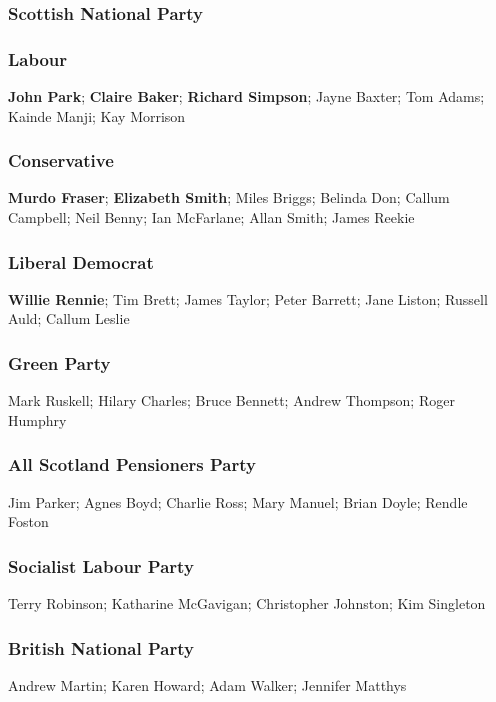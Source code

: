 \begin{resultsiii}
\subsubsection*{Scottish National Party}
\subsubsection*{Labour}
\textbf{John Park}; \textbf{Claire Baker}; \textbf{Richard Simpson}; Jayne Baxter; Tom Adams; Kainde Manji; Kay Morrison
\subsubsection*{Conservative}
\textbf{Murdo Fraser}; \textbf{Elizabeth Smith}; Miles Briggs; Belinda Don; Callum Campbell; Neil Benny; Ian McFarlane; Allan Smith; James Reekie
\subsubsection*{Liberal Democrat}
\textbf{Willie Rennie}; Tim Brett; James Taylor; Peter Barrett; Jane Liston; Russell Auld; Callum Leslie
\subsubsection*{Green Party}
Mark Ruskell; Hilary Charles; Bruce Bennett; Andrew Thompson; Roger Humphry
\subsubsection*{All Scotland Pensioners Party}
Jim Parker; Agnes Boyd; Charlie Ross; Mary Manuel; Brian Doyle; Rendle Foston
\subsubsection*{Socialist Labour Party}
Terry Robinson; Katharine McGavigan; Christopher Johnston; Kim Singleton
\subsubsection*{British National Party}
Andrew Martin; Karen Howard; Adam Walker; Jennifer Matthys

\end{resultsiii}
